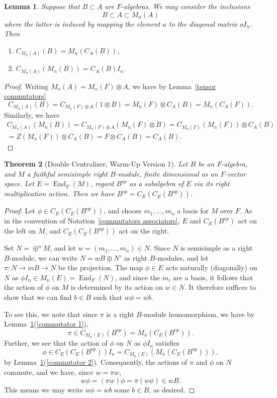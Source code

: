 \documentclass[12pt]{report}
\theoremstyle{plain}
\newtheorem{thm}{Theorem}[section]
\newtheorem{lem}[thm]{Lemma}
\newcommand{\oper}[1]{\operatorname{#1}}
\newcommand{\End}{\oper{End}}
\begin{document}
\begin{lem} \label{commutator lemma}
Suppose that $B \subset A$ are $F$-algebras. We may consider the inclusions 
\[B \subset A \subset M_n(A)\]
where the latter is induced by mapping the element $a$ to the diagonal
matrix
\(a I_n\). Then 
\begin{enumerate}[1. ]
\item \label{commutator 1} $C_{M_n(A)}(B) = M_n(C_A(B))$,
\item \label{commutator 2} $C_{M_n(A)}(M_n(B)) = C_A(B) I_n$.
\end{enumerate}
\end{lem}
\begin{proof}
Writing $M_n(A) = M_n(F) \otimes A$, we have by Lemma~\ref{tensor commutators}
\[C_{M_n(A)}(B) = C_{M_n(F) \otimes A}(1 \otimes B) = M_n(F) \otimes C_A(B)
= M_n(C_A(F)).\] 
Similarly, we have 
\begin{multline*}
C_{M_n(A)}(M_n(B)) = C_{M_n(F) \otimes A}(M_n(F) \otimes B) =
C_{M_n(F)}(M_n(F)) \otimes C_A(B) \\ 
= Z(M_n(F)) \otimes C_A(B) = F \otimes C_A(B) = C_A(B).
\end{multline*}
\end{proof}



\begin{thm}[Double Centralizer, Warm-Up Version 1] \label{dc1} 
Let $B$ be an $F$-algebra, and $M$ a faithful semisimple right $B$-module,
finite dimensional as an $F$-vector space. Let $E = \End_F(M)$, regard
$B^{op}$ as a subalgebra of $E$ via its right multiplication action. Then
we have $B^{op} = C_E(C_E(B^{op}))$.
\end{thm}
\begin{proof}
Let $\phi \in C_E(C_E(B^{op}))$, and choose $m_1, \ldots, m_n$ a basis for $M$ over
$F$. As in the convention of Notation~\ref{commutators associators}, $E$
and $C_E(B^{op})$
act on the left on $M$, and $C_E(C_E(B^{op}))$ act on the right. 

Set $N = \oplus^n M$, and let $w = (m_1, \ldots, m_n) \in N$. Since $N$ is
semisimple as a right $B$-module, we can write $N = wB \oplus N'$ as right
$B$-modules, and let $\pi : N \to mB \to N$ be the projection. The map $\phi \in
E$ acts naturally (diagonally) on $N$ as $\phi I_n \in M_n(E) = \End_F(N)$,
and since the $m_i$ are a basis, it follows that the action of $\phi$ on
$M$ is determined by its action on $w \in N$. It therefore suffices to show
that we can find $b \in B$ such that $w \phi = w b$.

To see this, we note that since $\pi$ is a right $B$-module homomorphism,
we have by Lemma~\ref{commutator lemma}(\ref{commutator 1}),
\[\pi \in C_{M_n(E)}(B^{op}) = M_n(C_E(B^{op})).\]
Further, we see that the action of $\phi$ on $N$ as $\phi I_n$ satisfies
\[\phi \in C_E(C_E(B^{op})) I_n = C_{M_n(E)}(M_n(C_E(B^{op}))),\]
by Lemma~\ref{commutator lemma}(\ref{commutator 2}). Consequently, the actions of $\pi$ and
$\phi$ on $N$ commute, and we have, since $w = \pi w$,
\[ w \phi = (\pi w) \phi = \pi(w \phi) \in wB.\]
This means we may write $w\phi = wb$ some $b \in B$, as desired.
\end{proof}
\end{document}
